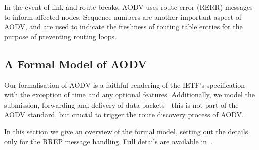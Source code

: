 \documentclass[envcountsame,envcountsect,orivec,runningheads]{llncs}
\begin{document}
In the event of link and route breaks, AODV uses route error (RERR)
messages to inform affected nodes. Sequence numbers are another
important aspect of AODV, and are used to indicate the freshness of
routing table entries for the purpose of preventing routing loops.

\subsection{A Formal Model of AODV}\label{sec:AODV_model}


\noindent
Our formalisation of AODV is a faithful rendering of the IETF's
specification~\cite{rfc3561} with the exception of time and any
optional features.  Additionally, we model the submission, forwarding
and delivery of data packets---this is not part of the AODV
standard, but crucial to trigger the route discovery
process of AODV\@.

In this section we give an overview of the formal model, setting out
the details only for the RREP message handling.  Full details are
available in~\cite[Sect. 6]{TR11}.
\end{document}
